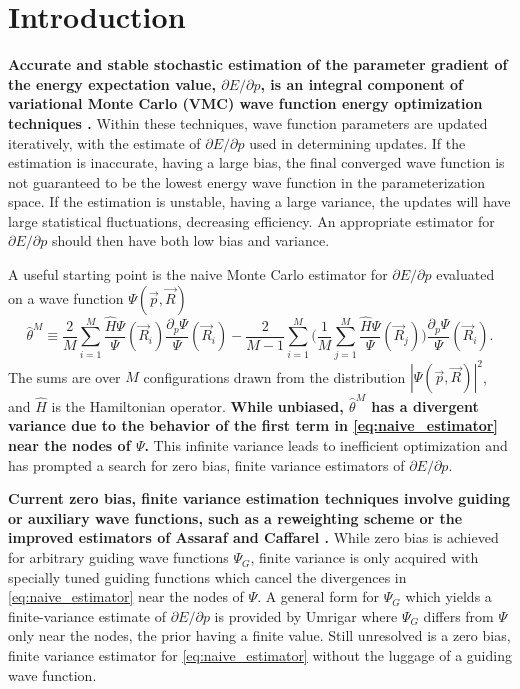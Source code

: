 \documentclass{article}
\begin{document}
\section{Introduction}
\textbf{Accurate and stable stochastic estimation of the parameter gradient of the energy expectation value, $\partial E/\partial p$, is an integral component of variational Monte Carlo (VMC) wave function energy optimization techniques \cite{PhysRevB.64.024512, doi:10.1063/1.1604379, Toulouse2007}.}
Within these techniques, wave function parameters are updated iteratively, with the estimate of $\partial E/\partial p$ used in determining updates.
If the estimation is inaccurate, having a large bias, the final converged wave function is not guaranteed to be the lowest energy wave function in the parameterization space.
If the estimation is unstable, having a large variance, the updates will have large statistical fluctuations, decreasing efficiency.
An appropriate estimator for $\partial E/ \partial p$ should then have both low bias and variance.

A useful starting point is the naive Monte Carlo estimator for $\partial E/\partial p$ evaluated on a wave function $\Psi(\vec{p}, \vec{R})$ 
\begin{equation}
\hat{\theta}^M \equiv \frac{2}{M}\sum_{i=1}^M \frac{\hat{H}\Psi}{\Psi}(\vec{R}_i) \frac{\partial_p \Psi}{\Psi}(\vec{R}_i) - \frac{2}{M-1} \sum_{i=1}^M \Big(\frac{1}{M} \sum_{j=1}^M \frac{\hat{H}\Psi}{\Psi}(\vec{R}_j)\Big)\frac{\partial_p \Psi}{\Psi}(\vec{R}_i). \label{eq:naive_estimator}
\end{equation}
The sums are over $M$ configurations drawn from the distribution $|\Psi(\vec{p}, \vec{R})|^2$, and $\hat{H}$ is the Hamiltonian operator.
\textbf{While unbiased, $\hat{\theta}^M$ has a divergent variance \cite{Avella} due to the behavior of the first term in \eqref{eq:naive_estimator} near the nodes of $\Psi$.}
This infinite variance leads to inefficient optimization and has prompted a search for zero bias, finite variance estimators of $\partial E/\partial p$.

\textbf{Current zero bias, finite variance estimation techniques involve guiding or auxiliary wave functions, such as a reweighting scheme \cite{Avella, Attaccalite2008} or the improved estimators of Assaraf and Caffarel \cite{doi:10.1063/1.1286598, Assaraf2003}.}
While zero bias is achieved for arbitrary guiding wave functions $\Psi_G$, finite variance is only acquired with specially tuned guiding functions which cancel the divergences in \eqref{eq:naive_estimator} near the nodes of $\Psi$.
A general form for $\Psi_G$ which yields a finite-variance estimate of $\partial E/\partial p$ is provided by Umrigar \cite{doi:10.1063/1.4933112} where $\Psi_G$ differs from $\Psi$ only near the nodes, the prior having a finite value.
Still unresolved is a zero bias, finite variance estimator for \eqref{eq:naive_estimator} without the luggage of a guiding wave function. 
\end{document}
